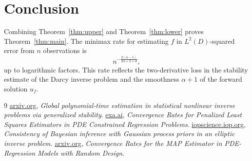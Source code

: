 \documentclass[11pt]{article}
\theoremstyle{definition}
\theoremstyle{remark}
\begin{document}
\section{Conclusion}

Combining Theorem~\ref{thm:upper} and Theorem~\ref{thm:lower} proves Theorem~\ref{thm:main}. The minimax rate for estimating \(f\) in \(L^2(D)\)-squared error from \(n\) observations is
\[
n^{-\frac{2(\alpha-1)}{2\alpha+2+d}},
\]
up to logarithmic factors. This rate reflects the two-derivative loss in the stability estimate of the Darcy inverse problem and the smoothness \(\alpha+1\) of the forward solution \(u_f\).

\begin{thebibliography}{9}
\href{https://arxiv.org/html/2601.09007}{arxiv.org}, \emph{Global polynomial-time estimation in statistical nonlinear inverse problems via generalized stability}.
\href{https://exa.ai/library/publication/rj7jk1yjt53}{exa.ai}, \emph{Convergence Rates for Penalized Least Squares Estimators in PDE Constrained Regression Problems}.
\href{https://google.iopscience.iop.org/article/10.1088/1361-6420/ab7d2a}{iopscience.iop.org}, \emph{Consistency of Bayesian inference with Gaussian process priors in an elliptic inverse problem}.
\href{https://arxiv.org/html/2409.03417}{arxiv.org}, \emph{Convergence Rates for the MAP Estimator in PDE-Regression Models with Random Design}.
\end{thebibliography}
\end{document}
